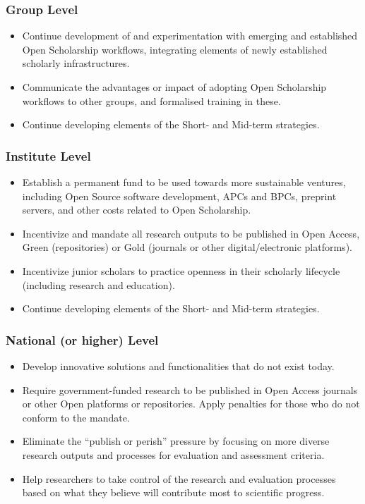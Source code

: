 \subsubsection{Group Level}\label{group-level-1}

\begin{itemize}
\item
  Continue development of and experimentation with emerging and
  established Open Scholarship workflows, integrating elements of newly
  established scholarly infrastructures.
\item
  Communicate the advantages or impact of adopting Open Scholarship
  workflows to other groups, and formalised training in these.
\item
  Continue developing elements of the Short- and Mid-term strategies.
\end{itemize}

\subsubsection{Institute Level}\label{institute-level-1}

\begin{itemize}
\item
  Establish a permanent fund to be used towards more sustainable
  ventures, including Open Source software development, APCs and BPCs,
  preprint servers, and other costs related to Open Scholarship.
\item
  Incentivize and mandate all research outputs to be published in Open
  Access, Green (repositories) or Gold (journals or other
  digital/electronic platforms).
\item
  Incentivize junior scholars to practice openness in their scholarly
  lifecycle (including research and education).
\item
  Continue developing elements of the Short- and Mid-term strategies.
\end{itemize}

\subsubsection{National (or higher)
Level}\label{national-or-higher-level-1}

\begin{itemize}
\item
  Develop innovative solutions and functionalities that do not exist
  today.
\item
  Require government-funded research to be published in Open Access
  journals or other Open platforms or repositories. Apply penalties for
  those who do not conform to the mandate.
\item
  Eliminate the ``publish or perish'' pressure by focusing on more
  diverse research outputs and processes for evaluation and assessment
  criteria.
\item
  Help researchers to take control of the research and evaluation
  processes based on what they believe will contribute most to
  scientific progress.
\end{itemize}

